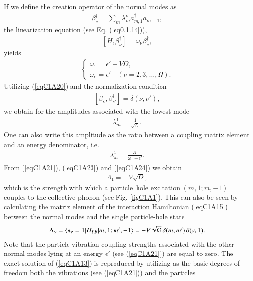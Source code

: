 If we define the creation operator of the normal modes as
 \begin{align}\label{eqC1A19} 
\beta^\dagger_\nu=\sum_m \lambda_m^\nu a_{m,1}^\dagger a_{m,-1},
 \end{align}
the linearization equation (see Eq. (\ref{eq0.1.14})),
 \begin{align}\label{eqC1A20} 
[H,\beta_\nu^\dagger]=\omega_\nu\beta^\dagger_\nu,
 \end{align}
yields
 \begin{align}\label{eqC1A21} 
\left\{\begin{array}{l}
 \omega_1=\epsilon'-V\Omega,\\ 
\omega_\nu=\epsilon'\quad (\nu=2,3,\dots,\Omega).
\end{array} \right.
 \end{align}
Utilizing (\ref{eqC1A20}) and the normalization condition
 \begin{align}\label{eqC1A22} 
[\beta_\nu,\beta^\dagger_{\nu'}]=\delta(\nu,\nu'),
 \end{align}
we obtain for the amplitudes associated with the lowest mode
 \begin{align}\label{eqC1A23} 
\lambda_m^1=\frac{1}{\sqrt{\Omega}}.
 \end{align}
One can also write this amplitude as the ratio between a coupling matrix
element and an energy denominator, i.e.
 \begin{align}\label{eqC1A24} 
\lambda_m^1=\frac{\Lambda_1}{\omega_1-\epsilon'}.
 \end{align} 
From (\ref{eqC1A21}), (\ref{eqC1A23}) and (\ref{eqC1A24}) we obtain
 \begin{align}\label{eqC1A25} 
\Lambda_1=-V\sqrt{\Omega},
 \end{align}
which is the strength with which a particle~hole excitation $(m, 1; m, -1)$
couples to the collective phonon (see Fig. \ref{figC1A1}). This can also be seen by calculating
the matrix element of the interaction Hamiltonian (\ref{eqC1A15}) between the normal
modes and the single particle-hole state
 \begin{align}\label{eqC1A26} 
\Lambda_\nu=\langle {n_\nu=1|H_{TB}|m,1;m',-1} \rangle=-V\sqrt{\Omega}\,\delta(m,m')\,\delta(\nu,1).
 \end{align}
Note that the particle-vibration coupling strengths associated with the other
normal modes lying at an energy $\epsilon'$ (see (\ref{eqC1A21})) are equal to zero. The exact solution of (\ref{eqC1A13}) is reproduced by utilizing
as the basic degrees of freedom both the vibrations (see (\ref{eqC1A21})) and the particles
